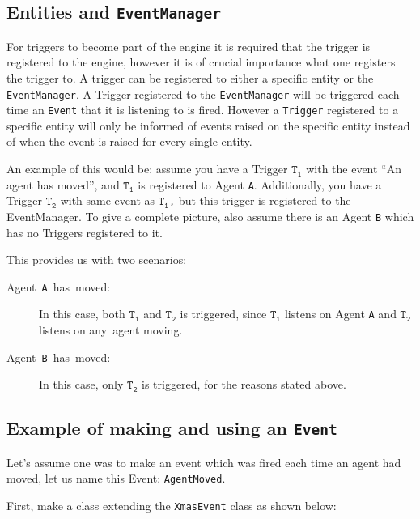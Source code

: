 \subsection{Entities and \texttt{EventManager}}

For triggers to become part of the engine it is required that the
trigger is registered to the engine, however it is of crucial importance
what one registers the trigger to. A trigger can be registered to
either a specific entity or the \texttt{EventManager}. A Trigger registered
to the \texttt{EventManager} will be triggered each time an \texttt{Event}
that it is listening to is fired. However a \texttt{Trigger} registered
to a specific entity will only be informed of events raised on the
specific entity instead of when the event is raised for every single
entity. 

An example of this would be: assume you have a Trigger \texttt{$\mathtt{T_{1}}$}
with the event \textquotedblleft{}An agent has moved\textquotedblright{},
and \texttt{$\mathtt{T_{1}}$} is registered to Agent \texttt{A}.
Additionally, you have a Trigger \texttt{$\mathtt{T_{2}}$} with same
event as \texttt{$\mathtt{T_{1}}$,} but this trigger is registered
to the EventManager. To give a complete picture, also assume there
is an Agent \texttt{B} which has no Triggers registered to it.

This provides us with two scenarios:
\begin{description}
\item [{Agent~\texttt{A}~has~moved:}] In this case, both \texttt{$\mathtt{T_{1}}$}
and \texttt{$\mathtt{T_{2}}$} is triggered, since \texttt{$\mathtt{T_{1}}$}
listens on Agent \texttt{A} and \texttt{$\mathtt{T_{2}}$} listens
on any\texttt{ }agent moving.
\item [{Agent~\texttt{B}~has~moved:}] In this case, only $\mathtt{T_{2}}$
is triggered, for the reasons stated above.
\end{description}

\subsection{Example of making and using an \texttt{Event}}

Let\textquoteright{}s assume one was to make an event which was fired
each time an agent had moved, let us name this Event: \texttt{AgentMoved}.

First, make a class extending the \texttt{XmasEvent} class as shown
below:

